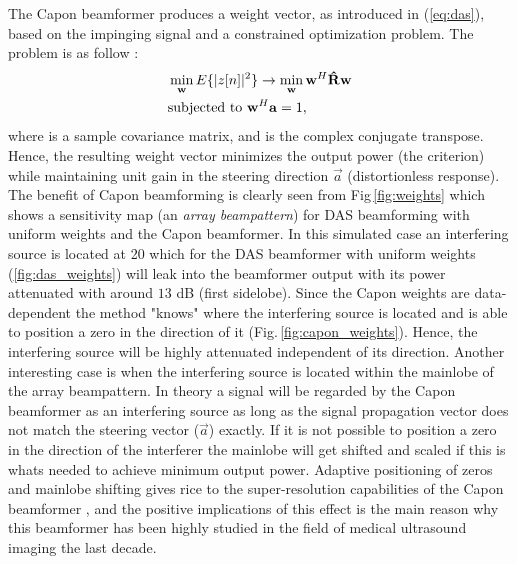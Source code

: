 The Capon beamformer produces a weight vector, as introduced in (\ref{eq:das}), based on the impinging signal and a constrained optimization problem. The problem is as follow \cite{Capon1969}:
\begin{align}
&\min_{\mathbf{w}} E\{|z[n]|^2\} \rightarrow \min_{\mathbf{w}} \mathbf{w}^H \mathbf{\hat{R}} \mathbf{w} \label{eq:capon_optimization_criteria} \\
&\text{subjected to } \mathbf{w}^H\mathbf{a} = 1,
\end{align}
where  is a sample covariance matrix, and  is the complex conjugate transpose. Hence, the resulting weight vector minimizes the output power (the criterion) while maintaining unit gain in the steering direction $\vec{a}$ (distortionless response). The benefit of Capon beamforming is clearly seen from Fig\,\ref{fig:weights} which shows a sensitivity map (an \textit{array beampattern}) for DAS beamforming with uniform weights and the Capon beamformer. In this simulated case an interfering source is located at 20\degree{} which for the DAS beamformer with uniform weights (\ref{fig:das_weights}) will leak into the beamformer output with its power attenuated with around $13$ dB (first sidelobe). Since the Capon weights are data-dependent the method "knows" where the interfering source is located and is able to position a zero in the direction of it (Fig.\,\ref{fig:capon_weights}). Hence, the interfering source will be highly attenuated independent of its direction. Another interesting case is when the interfering source is located within the mainlobe of the array beampattern. In theory a signal will be regarded by the Capon beamformer as an interfering source as long as the signal propagation vector does not match the steering vector ($\vec{a}$) exactly. If it is not possible to position a zero in the direction of the interferer the mainlobe will get shifted and scaled if this is whats needed to achieve minimum output power. Adaptive positioning of zeros and mainlobe shifting gives rice to the super-resolution capabilities of the Capon beamformer \cite{Synnevag2007}, and the positive implications of this effect \cite{Synnevag2009} is the main reason why this beamformer has been highly studied in the field of medical ultrasound imaging the last decade.

